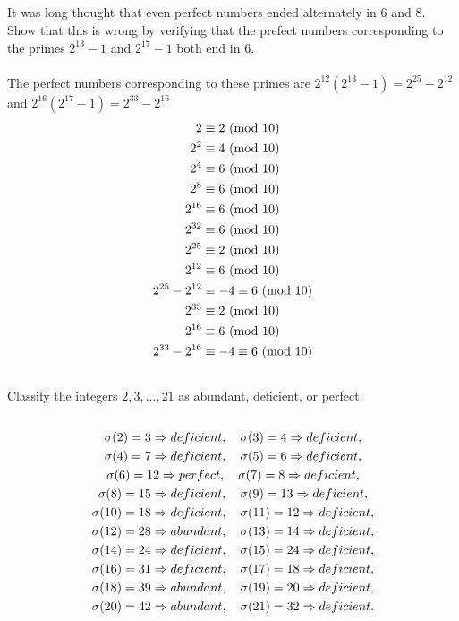 \documentclass{article}
\begin{document}
\subsection{}
It was long thought that even perfect numbers ended alternately in 6 and 8.
Show that this is wrong by verifying that the prefect numbers corresponding to
the primes $2^{13} - 1$ and $2^{17} - 1$ both end in 6.\\~\\
The perfect numbers corresponding to these primes are
$2^{12}(2^{13} - 1) = 2^{25} - 2^{12}$ and $2^{16}(2^{17} - 1) = 2^{33} - 2^{16}$
\begin{align*}
    2 &\equiv 2 \ (\mathrm{mod}\ 10)\\
    2^2 &\equiv 4 \ (\mathrm{mod}\ 10)\\
    2^4 &\equiv 6 \ (\mathrm{mod}\ 10)\\
    2^8 &\equiv 6 \ (\mathrm{mod}\ 10)\\
    2^{16} &\equiv 6 \ (\mathrm{mod}\ 10)\\
    2^{32} &\equiv 6 \ (\mathrm{mod}\ 10)\\
    2^{25} &\equiv 2 \ (\mathrm{mod}\ 10)\\
    2^{12} &\equiv 6 \ (\mathrm{mod}\ 10)\\
    2^{25} - 2^{12} &\equiv -4 \equiv 6 \ (\mathrm{mod}\ 10)\\
    2^{33} &\equiv 2 \ (\mathrm{mod}\ 10)\\
    2^{16} &\equiv 6 \ (\mathrm{mod}\ 10)\\
    2^{33} - 2^{16} &\equiv -4 \equiv 6 \ (\mathrm{mod}\ 10)
\end{align*}

\subsection{}
Classify the integers $2, 3, ..., 21$ as abundant, deficient, or perfect.\\~\\
\begin{gather*}
    \sigma(2) = 3 \Rightarrow deficient, \quad \sigma(3) = 4 \Rightarrow deficient,\\
    \sigma(4) = 7 \Rightarrow deficient, \quad \sigma(5) = 6 \Rightarrow deficient,\\
    \sigma(6) = 12 \Rightarrow perfect, \quad \sigma(7) = 8 \Rightarrow deficient,\\
    \sigma(8) = 15 \Rightarrow deficient, \quad \sigma(9) = 13 \Rightarrow deficient,\\
    \sigma(10) = 18 \Rightarrow deficient, \quad \sigma(11) = 12 \Rightarrow deficient,\\
    \sigma(12) = 28 \Rightarrow abundant, \quad \sigma(13) = 14 \Rightarrow deficient,\\
    \sigma(14) = 24 \Rightarrow deficient, \quad \sigma(15) = 24 \Rightarrow deficient,\\
    \sigma(16) = 31 \Rightarrow deficient, \quad \sigma(17) = 18 \Rightarrow deficient,\\
    \sigma(18) = 39 \Rightarrow abundant, \quad \sigma(19) = 20 \Rightarrow deficient,\\
    \sigma(20) = 42 \Rightarrow abundant, \quad \sigma(21) = 32 \Rightarrow deficient.
\end{gather*}
\end{document}
